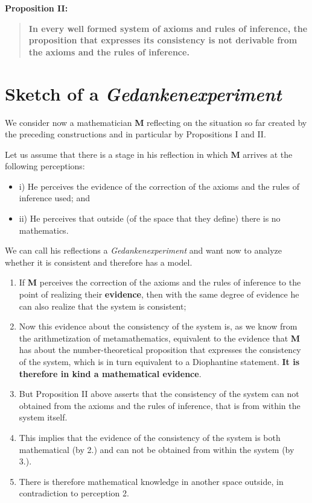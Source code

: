 \documentclass[12pt]{article}
\begin{document}
\textbf{Proposition II:}

\begin{quote}
\textbf{In every well formed system of axioms and rules of inference, the proposition that expresses its consistency is not derivable from the axioms and the rules of inference.}
\end{quote}

\section{Sketch of a \emph{Gedankenexperiment}}\normalsize

We consider now a mathematician \textbf{M} reflecting on the situation so far created by the preceding constructions and in particular by Propositions I and II.

Let us assume that there is a stage in his reflection  in which \textbf{M} arrives at the following perceptions:

\begin{itemize}
\item i) He perceives the evidence of the correction of the axioms and the rules of inference used; and

\item ii) He perceives that outside (of the space that they define) there is no mathematics. 
\end{itemize}

We can call his reflections a \emph{Gedankenexperiment} and want now to analyze whether it is consistent and therefore has a model.

\begin{enumerate}
\item If \textbf{M} perceives the correction of the axioms and the rules of inference to the point of realizing their \textbf{evidence}, then with the same degree of evidence he can also realize that the system is consistent;

\item Now this evidence about the consistency of the system is, as we know from the arithmetization of metamathematics, equivalent to the evidence that \textbf{M} has about the number-theoretical proposition that expresses the consistency of the system, which is in turn equivalent to a Diophantine statement. \textbf{It is therefore in kind a mathematical evidence}.

\item But Proposition II above asserts that the consistency of the system can not obtained from the axioms and the rules of inference, that is from within the system itself.

\item This implies that the evidence of the consistency of the system is both mathematical (by 2.) and can not be obtained from within the system (by 3.). 

\item There is therefore mathematical knowledge in another space outside, in contradiction to perception 2.
\end{enumerate}
\end{document}
